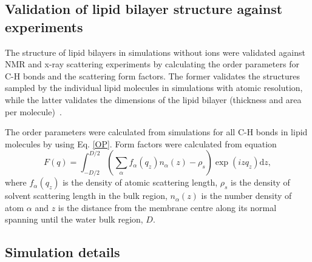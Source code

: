 \documentclass[aip,jcp,twocolumn]{revtex4}
\begin{document}
\subsection{Validation of lipid bilayer structure against experiments}

The structure of lipid bilayers in simulations without ions were validated against NMR and 
\mbox{x-ray} scattering experiments by calculating the order parameters
for C-H bonds and the scattering form factors. The former validates the structures sampled by the individual
lipid molecules in simulations with atomic resolution, while the latter
validates the dimensions of the lipid bilayer (thickness and area per
molecule)~\cite{ollila16}.

The order parameters were calculated from simulations for all C-H bonds
in lipid molecules by using Eq. \ref{OP}. Form factors were calculated 
from equation 
\begin{equation}
  F(q) = \int _{-D/2} ^{D/2} \left ( \sum _\alpha f_\alpha (q_z) n_\alpha (z) - \rho _s \right ) \exp (izq_z) \mathrm{d}z,
\end{equation}
where $f_\alpha(q_z)$ is the density of atomic scattering length, 
$\rho_s$ is the density of solvent scattering length in the bulk region,
$n_\alpha (z)$ is the number density of atom $\alpha$ and
$z$ is the distance from the membrane centre along its normal 
spanning until the water bulk region, $D$. 




\subsection{Simulation details}
\end{document}
